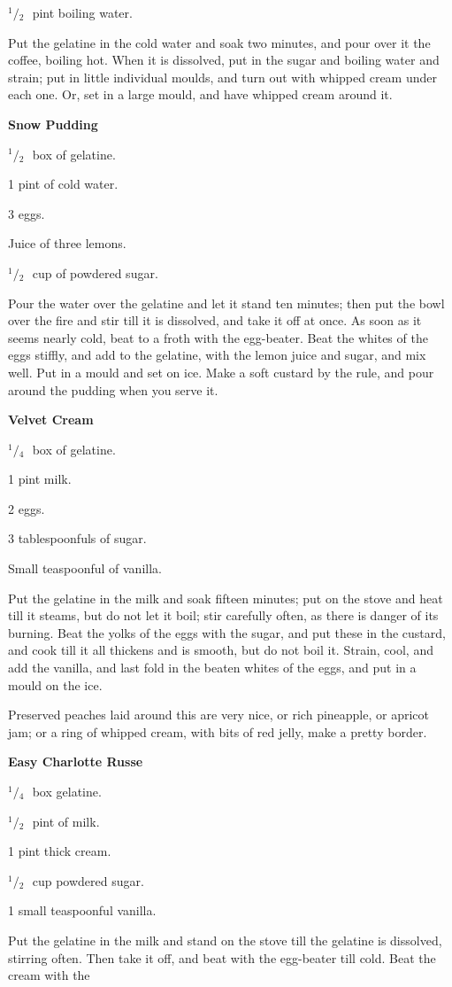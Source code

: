 \documentclass[11pt]{book}
\newcommand{\indpar}{\par\noindent\hspace*{\parindent}}
\newcommand{\ingredient}{\indpar}
\newcommand{\instruction}{\indpar}
\newcommand{\OneHalf}{\ensuremath{{}^1\!\!/\!{}_2\mbox{\ }}}
\newcommand{\OneQuarter}{\ensuremath{{}^1\!\!/\!{}_4\mbox{\ }}}
\newenvironment{RecipeTitle}{\medskip\begin{center}\large\bf }{\end{center}\smallskip}
\begin{document}
\ingredient  \OneHalf pint boiling water.
\instruction  Put the gelatine in the cold water and soak two minutes, and
pour over it the coffee, boiling hot.  When it is dissolved,
put in the sugar and boiling water and strain;  put in little 
individual moulds, and turn out with whipped cream under each
one.  Or, set in a large mould, and have whipped cream around
it.
\begin{RecipeTitle}
Snow Pudding\label{snow_pudding}
\end{RecipeTitle}
\ingredient  \OneHalf box of gelatine.
\ingredient  1 pint of cold water.
\ingredient  3 eggs.
\ingredient  Juice of three lemons.
\ingredient  \OneHalf cup of powdered sugar.
\instruction  Pour the water over the gelatine and let it stand ten
minutes; then put the bowl over the fire and stir till it is
dissolved, and take it off at once.  As soon as it seems
nearly cold, beat to a froth with the egg-beater.  Beat the
whites of the eggs stiffly, and add to the gelatine, with the
lemon juice and sugar, and mix well.  Put in a mould and set
on ice.  Make a soft custard by the rule, and pour around the
pudding when you serve it.
\begin{RecipeTitle}
Velvet Cream\label{velvet_cream}
\end{RecipeTitle}
\ingredient  \OneQuarter box of gelatine.
\ingredient  1 pint milk.
\ingredient  2 eggs.
\ingredient  3 tablespoonfuls of sugar.
\ingredient  Small teaspoonful of vanilla.
\instruction  Put the gelatine in the milk and soak fifteen minutes; put
on the stove and heat till it steams, but do not let it boil;
stir carefully often, as there is danger of its burning.  Beat
the yolks of the eggs with the sugar, and put these in the
custard, and cook till it all thickens and is smooth, but do
not boil it.  Strain, cool, and add the vanilla, and last fold
in the beaten whites of the eggs, and put in a mould on the
ice.
\instruction  Preserved peaches laid around this are very nice, or rich
pineapple, or apricot jam; or a ring of whipped cream, with
bits of red jelly, make a pretty border.
\begin{RecipeTitle}
Easy Charlotte Russe\label{easy_charlotte_russe}
\end{RecipeTitle}
\ingredient  \OneQuarter box gelatine.
\ingredient  \OneHalf pint of milk.
\ingredient  1 pint thick cream.
\ingredient  \OneHalf cup powdered sugar.
\ingredient  1 small teaspoonful vanilla.
\instruction  Put the gelatine in the milk and stand on the stove till the
gelatine is dissolved, stirring often.  Then take it off, and
beat with the egg-beater till cold.  Beat the cream with the
\end{document}
